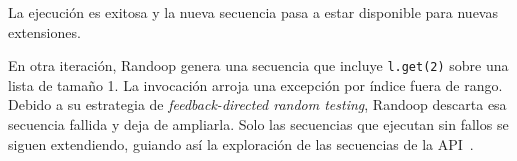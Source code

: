 La ejecución es exitosa y la nueva secuencia pasa a estar disponible para
nuevas extensiones.

En otra iteración, Randoop genera una secuencia que incluye
\texttt{l.get(2)} sobre una lista de tamaño 1. La invocación arroja una
excepción por índice fuera de rango. Debido a su estrategia de
\emph{feedback-directed random testing}, Randoop descarta esa secuencia
fallida y deja de ampliarla. Solo las secuencias que ejecutan sin fallos
se siguen extendiendo, guiando así la exploración de las secuencias de la
API~\cite{Pacheco07,Pacheco08}.

%





